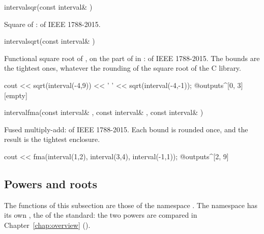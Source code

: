 \begin{deffun}{interval}{sqr}{(const interval\& )}
  \begin{operation}
  \end{operation}
  Square of :  of IEEE 1788-2015.
\end{deffun}

\begin{deffun}{interval}{sqrt}{(const interval\& )}
  \begin{operation}
  \end{operation}
  Functional square root of , on the part of  in
  :  of IEEE 1788-2015. The bounds are the
  tightest ones, whatever the rounding of the square root of the C
  library.\newinvfive
\begin{example}
cout << sqrt(interval(-4,9)) << ' ' << sqrt(interval(-4,-1));
@outputs^[0, 3] [empty]~
\end{example}
\end{deffun}

\begin{deffun}{interval}{fma}{(const interval\& , const interval\& , const interval\& )}
  \begin{operation}
  \end{operation}
  Fused multiply-add:  of IEEE 1788-2015. Each bound is rounded
  once, and the result is the tightest enclosure.\newinvfive
\begin{example}
cout << fma(interval(1,2), interval(3,4), interval(-1,1));
@outputs^[2, 9]~
\end{example}
\end{deffun}

\subsection{Powers and roots}\label{sec:powers}
%

The functions of this subsection are those of the namespace . The
namespace  has its own , the  of
the standard: the two powers are compared in Chapter~\ref{chap:overview}
().

